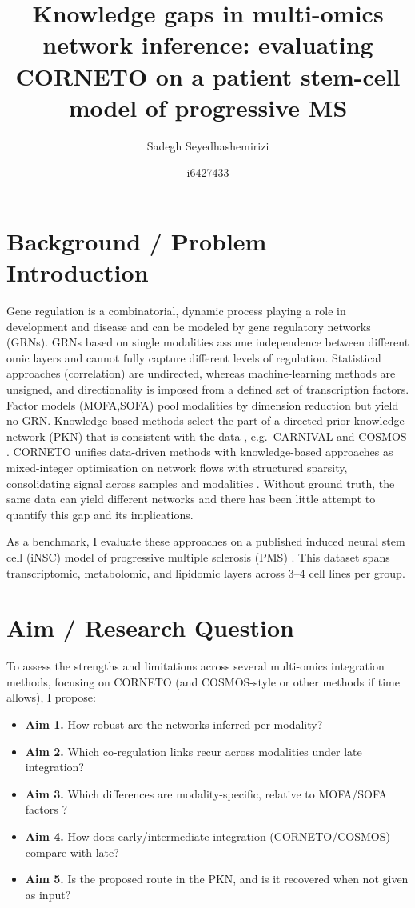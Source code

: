\documentclass[11pt, a4paper]{article}
\title{\vspace{-1.5cm}\textbf{\large Knowledge gaps in multi-omics network inference: evaluating CORNETO on a patient stem-cell model of progressive MS}}
\author{\small Sadegh Seyedhashemirizi \and \small i6427433}
\date{\vspace{-2.5ex}} %
\begin{document}
\maketitle

\section*{Background / Problem Introduction}
Gene regulation is a combinatorial, dynamic process playing a role in development and disease and can be modeled by gene regulatory networks (GRNs). GRNs based on single modalities assume independence between different omic layers and cannot fully capture different levels of regulation. Statistical approaches (correlation) are undirected, whereas machine-learning methods are unsigned, and directionality is imposed from a defined set of transcription factors\cite{huynhthu2010genie3}. Factor models (MOFA,SOFA) \cite{argelaguet2020mofa} pool modalities by dimension reduction but yield no GRN. Knowledge-based methods select the part of a directed prior-knowledge network (PKN) that is consistent with the data \cite{garridorodriguez2022}, e.g.\ CARNIVAL \cite{liu2019carnival} and COSMOS \cite{dugourd2021cosmos}. CORNETO unifies data-driven methods with knowledge-based approaches as mixed-integer optimisation on network flows with structured sparsity, consolidating signal across samples and modalities \cite{rodriguezmier2025corneto}. Without ground truth, the same data can yield different networks and there has been little attempt to quantify this gap and its implications.

As a benchmark, I evaluate these approaches on a published induced neural stem cell (iNSC) model of progressive multiple sclerosis (PMS) \cite{reich2018ms,ionescu2024}. This dataset spans transcriptomic, metabolomic, and lipidomic layers across 3--4 cell lines per group.

\section*{Aim / Research Question}
To assess the strengths and limitations across several multi-omics integration methods, focusing on CORNETO (and COSMOS-style or other methods if time allows), I propose:

\begin{itemize}[noitemsep, topsep=2pt, parsep=0pt, leftmargin=*]
    \item \textbf{Aim 1.} How robust are the networks inferred per modality?
    \item \textbf{Aim 2.} Which co-regulation links recur across modalities under late integration?
    \item \textbf{Aim 3.} Which differences are modality-specific, relative to MOFA/SOFA factors \cite{argelaguet2020mofa,capraz2026sofa}?
    \item \textbf{Aim 4.} How does early/intermediate integration (CORNETO/COSMOS) compare with late?
    \item \textbf{Aim 5.} Is the proposed route in the PKN, and is it recovered when not given as input?
\end{itemize}
\end{document}
